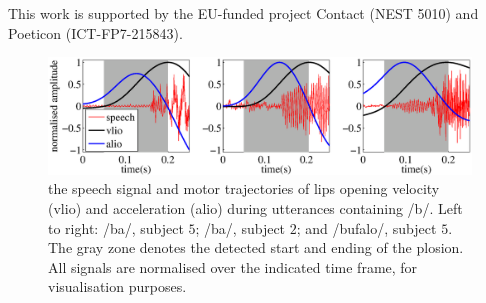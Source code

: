 \documentclass{pnastwo}
\newcommand{\vlio}{\textsf{vlio}}
\newcommand{\alio}{\textsf{alio}}
\begin{document}
\begin{article}








\begin{acknowledgments}
  This work is supported by the EU-funded project Contact (NEST 5010) and Poeticon (ICT-FP7-215843).
\end{acknowledgments}


 

\end{article}


\begin{figure}[t]
  \centerline{\includegraphics[width=\textwidth]{figs/figSamples}}
  \caption{the speech signal and motor trajectories of lips opening
    velocity (\vlio) and acceleration (\alio) during utterances containing /b/.
    Left to right: /ba/, subject $5$; /ba/, subject $2$; and /bufalo/, subject $5$.
    The gray zone denotes the detected start and ending of the plosion. All signals
    are normalised over the indicated time frame, for visualisation purposes.}
  \label{fig:isdView}
\end{figure}
\end{document}
